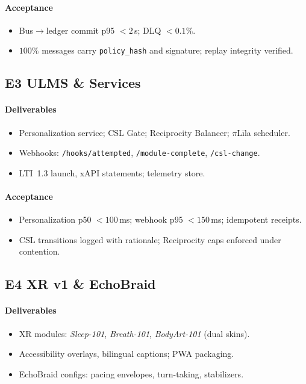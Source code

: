 \documentclass[11pt]{article}
\theoremstyle{plain}
\begin{document}
\paragraph{Acceptance}
\begin{itemize}
  \item Bus$\rightarrow$ledger commit p95 $<2$\,s; DLQ $<0.1\%$.
  \item $100\%$ messages carry \texttt{policy\_hash} and signature; replay integrity verified.
\end{itemize}

\subsection{E3 ULMS \& Services}
\paragraph{Deliverables}
\begin{itemize}
  \item Personalization service; CSL Gate; Reciprocity Balancer; $\pi$Līla scheduler.
  \item Webhooks: \texttt{/hooks/attempted}, \texttt{/module-complete}, \texttt{/csl-change}.
  \item LTI~1.3 launch, xAPI statements; telemetry store.
\end{itemize}
\paragraph{Acceptance}
\begin{itemize}
  \item Personalization p50 $<100$\,ms; webhook p95 $<150$\,ms; idempotent receipts.
  \item CSL transitions logged with rationale; Reciprocity caps enforced under contention.
\end{itemize}

\subsection{E4 XR v1 \& EchoBraid}
\paragraph{Deliverables}
\begin{itemize}
  \item XR modules: \emph{Sleep-101}, \emph{Breath-101}, \emph{BodyArt-101} (dual skins).
  \item Accessibility overlays, bilingual captions; PWA packaging.
  \item EchoBraid configs: pacing envelopes, turn-taking, stabilizers.
\end{itemize}
\end{document}
